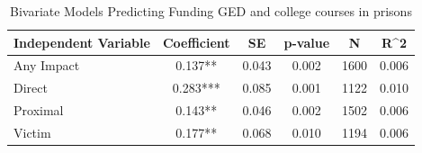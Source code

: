 \begin{table}

\caption{\label{tab:tab:ed_funds_bivariate}Bivariate Models Predicting Funding GED and college courses in prisons}
\centering
\begin{tabular}[t]{lccccc}
\toprule
Independent Variable & Coefficient & SE & p-value & N & R\textasciicircum{}2\\
\midrule
Any Impact & 0.137** & 0.043 & 0.002 & 1600 & 0.006\\
Direct & 0.283*** & 0.085 & 0.001 & 1122 & 0.010\\
Proximal & 0.143** & 0.046 & 0.002 & 1502 & 0.006\\
Victim & 0.177** & 0.068 & 0.010 & 1194 & 0.006\\
\bottomrule
\end{tabular}
\end{table}
